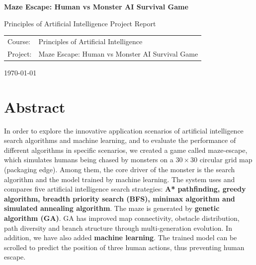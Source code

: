 \documentclass[12pt,a4paper]{article}
\begin{document}
\begin{titlepage}

\centering

\vspace*{2cm}

{\Huge\bfseries Maze Escape: Human vs Monster AI Survival Game\par}

\vspace{1.5cm}

{\Large Principles of Artificial Intelligence Project Report\par}



\vspace{2cm}

\begin{tabular}{ll}
Course: & Principles of Artificial Intelligence\\
Project: & Maze Escape: Human vs Monster AI Survival Game\\
\end{tabular}

\vfill

{\large \today}

\end{titlepage}

\tableofcontents
\newpage

\section*{Abstract}

In order to explore the innovative application scenarios of artificial intelligence search algorithms and machine learning, and to evaluate the performance of different algorithms in specific scenarios, we created a game called maze-escape, which simulates humans being chased by monsters on a $30\times30$ circular grid map (packaging edge). Among them, the core driver of the monster is the search algorithm and the model trained by machine learning. The system uses and compares five artificial intelligence search strategies: \textbf{A* pathfinding, greedy algorithm, breadth priority search (BFS), minimax algorithm and simulated annealing algorithm}. The maze is generated by \textbf{genetic algorithm (GA)}. GA has improved map connectivity, obstacle distribution, path diversity and branch structure through multi-generation evolution. In addition, we have also added \textbf{machine learning}. The trained model can be scrolled to predict the position of three human actions, thus preventing human escape. 
\end{document}
